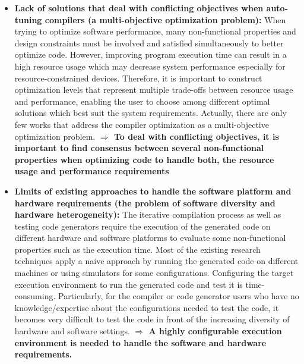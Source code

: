 \begin{itemize}
\item \textbf{Lack of solutions that deal with conflicting objectives when auto-tuning compilers (a multi-objective optimization problem):} 
When trying to optimize software performance, many non-functional properties and design constraints
must be involved and satisfied simultaneously to better optimize code. However, improving program
execution time can result in a high resource usage which may decrease system performance especially for resource-constrained devices. Therefore, it is important to construct optimization levels that represent multiple trade-offs between resource usage and performance, enabling the user to choose among different optimal solutions which best suit the system requirements. Actually, there are only few works that address the compiler optimization as a multi-objective optimization problem. 
\newline
\textbf{$\Rightarrow$ To deal with conflicting objectives, it is important to find consensus between several non-functional properties when optimizing code to handle both, the resource usage and performance requirements}


\item \textbf{Limits of existing approaches to handle the software platform and hardware requirements (the problem of software diversity and hardware heterogeneity):} The iterative compilation process as well as testing code generators require the execution of the generated code on different hardware and software platforms to evaluate some non-functional properties such as the execution time. Most of the existing research techniques apply a naive approach by running the generated code on different machines or using simulators for some configurations. Configuring the target execution environment to run the generated code and test it is time-consuming. Particularly, for the compiler or code generator users who have no knowledge/expertise about the configurations needed to test the code, it becomes very difficult to test the code in front of the increasing diversity of hardware and software settings.\newline
\textbf{$\Rightarrow$ A highly configurable execution environment is needed to handle the software and hardware requirements.} 


\end{itemize}
